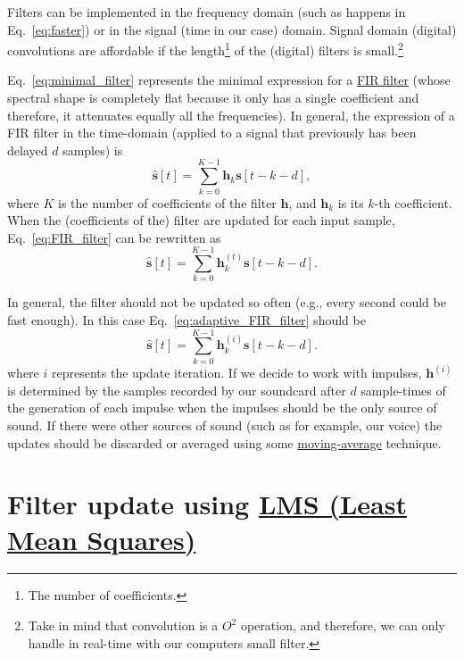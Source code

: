 Filters can be implemented in the frequency domain (such as happens in
Eq.~\eqref{eq:faster}) or in the signal (time in our case)
domain. Signal domain (digital) convolutions are affordable if the
length\footnote{The number of coefficients.} of the (digital) filters
is small.\footnote{Take in mind that convolution is a $O^2$ operation,
  and therefore, we can only handle in real-time with our computers
  small filter.}

Eq.~\eqref{eq:minimal_filter} represents the minimal expression for a
\href{https://en.wikipedia.org/wiki/Finite_impulse_response}{FIR
  filter} (whose spectral shape is completely flat because it only has
a single coefficient and therefore, it attenuates equally all the
frequencies). In general, the expression of a FIR filter in the
time-domain (applied to a signal that previously has been delayed $d$
samples) is
\begin{equation}
  \hat{\mathbf s}[t] = \sum_{k=0}^{K-1}{\mathbf h}_k{\mathbf s}[t-k-d],
  \label{eq:FIR_filter}
\end{equation}
where $K$ is the number of coefficients of the filter ${\mathbf h}$,
and ${\mathbf h}_k$ is its $k$-th coefficient. When the (coefficients
of the) filter are updated for each input sample,
Eq.~\eqref{eq:FIR_filter} can be rewritten as
\begin{equation}
  \hat{\mathbf s}[t] = \sum_{k=0}^{K-1}{\mathbf h}_k^{(t)}{\mathbf s}[t-k-d].
  \label{eq:adaptive_FIR_filter}
\end{equation}

In general, the filter should not be updated so often (e.g., every
second could be fast enough). In this case
Eq.~\eqref{eq:adaptive_FIR_filter} should be
\begin{equation}
  \hat{\mathbf s}[t] = \sum_{k=0}^{K-1}{\mathbf h}_k^{(i)}{\mathbf s}[t-k-d].
  \label{eq:adaptive_FIR_filter_second}
\end{equation}
where $i$ represents the update iteration.
If we decide to work with impulses, ${\mathbf h}^{(i)}$ is determined
by the samples recorded by our soundcard after $d$ sample-times of the
generation of each impulse when the impulses should be the only source
of sound. If there were other sources of sound (such as for example,
our voice) the updates should be discarded or averaged using some
\href{https://en.wikipedia.org/wiki/Moving_average}{moving-average}
technique.

\section{Filter update using  \href{https://en.wikipedia.org/wiki/Least_mean_squares_filter}{LMS (Least Mean Squares)}}

